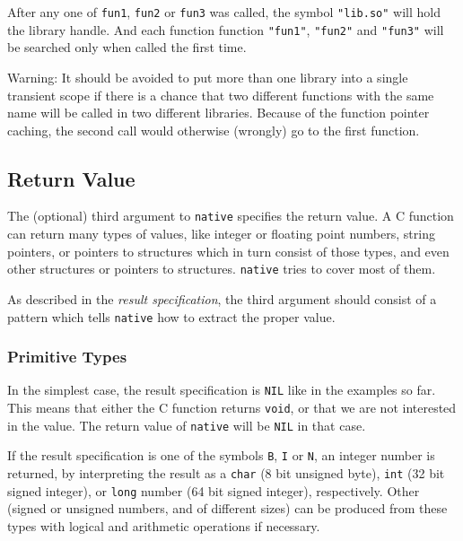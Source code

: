 After any one of \texttt{fun1}, \texttt{fun2} or \texttt{fun3} was
called, the symbol \texttt{"lib.so"} will hold the library handle. And
each function function \texttt{"fun1"}, \texttt{"fun2"} and
\texttt{"fun3"} will be searched only when called the first time.

Warning: It should be avoided to put more than one library into a single
transient scope if there is a chance that two different functions with
the same name will be called in two different libraries. Because of the
function pointer caching, the second call would otherwise (wrongly) go
to the first function.


\subsection{Return Value}
\label{sec:native-return-value}

The (optional) third argument to \texttt{native} specifies the return
value. A C function can return many types of values, like integer or
floating point numbers, string pointers, or pointers to structures which
in turn consist of those types, and even other structures or pointers to
structures. \texttt{native} tries to cover most of them.

As described in the \emph{result specification},
the third argument should consist of a pattern which tells
\texttt{native} how to extract the proper value.

\subsubsection{Primitive Types}
\label{sec:native-primitive-types}

In the simplest case, the result specification is \texttt{NIL} like in
the examples so far. This means that either the C function returns
\texttt{void}, or that we are not interested in the value. The return
value of \texttt{native} will be \texttt{NIL} in that case.

If the result specification is one of the symbols \texttt{B}, \texttt{I}
or \texttt{N}, an integer number is returned, by interpreting the result
as a \texttt{char} (8 bit unsigned byte), \texttt{int} (32 bit signed
integer), or \texttt{long} number (64 bit signed integer), respectively.
Other (signed or unsigned numbers, and of different sizes) can be
produced from these types with logical and arithmetic operations if
necessary.

